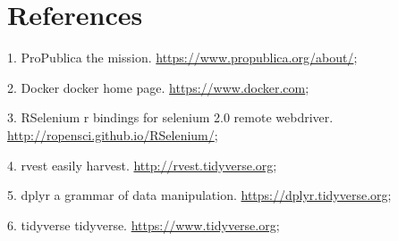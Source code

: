 \documentclass[10pt,letterpaper]{article}
\begin{document}
\hypertarget{references}{%
\section*{References}\label{references}}

\hypertarget{refs}{}
\leavevmode\hypertarget{ref-ProPublica}{}%
1. ProPublica the mission. \url{https://www.propublica.org/about/};

\leavevmode\hypertarget{ref-Docker}{}%
2. Docker docker home page. \url{https://www.docker.com};

\leavevmode\hypertarget{ref-RSelenium}{}%
3. RSelenium r bindings for selenium 2.0 remote webdriver.
\url{http://ropensci.github.io/RSelenium/};

\leavevmode\hypertarget{ref-rvest}{}%
4. rvest easily harvest. \url{http://rvest.tidyverse.org};

\leavevmode\hypertarget{ref-dplyr}{}%
5. dplyr a grammar of data manipulation.
\url{https://dplyr.tidyverse.org};

\leavevmode\hypertarget{ref-tidyverse}{}%
6. tidyverse tidyverse. \url{https://www.tidyverse.org};

\nolinenumbers
\end{document}
